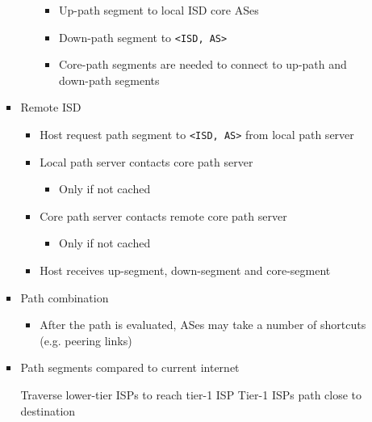 \begin{itemize}
\begin{itemize}
\begin{itemize}
\begin{itemize}
\begin{itemize}
                                    \item Up-path segment to local ISD core ASes
                                    \item Down-path segment to \verb+<ISD, AS>+
                                    \item Core-path segments are needed to connect to up-path and down-path segments
                                \end{itemize}
                        \end{itemize}
                    \item Remote ISD
                        \begin{itemize}
                            \item Host request path segment to \verb+<ISD, AS>+ from local path server
                            \item Local path server contacts core path server
                                \begin{itemize}
                                    \item Only if not cached
                                \end{itemize}
                            \item Core path server contacts remote core path server
                                \begin{itemize}
                                    \item Only if not cached
                                \end{itemize}
                            \item Host receives up-segment, down-segment and core-segment
                        \end{itemize}
                    \item Path combination
                        \begin{itemize}
                            \item After the path is evaluated, ASes may take a number of shortcuts (e.g. peering links)
                        \end{itemize}
                    \item Path segments compared to current internet
                        \begin{itemize}
                             Traverse lower-tier ISPs to reach tier-1 ISP
                             Tier-1 ISPs path close to destination

\end{itemize}
\end{itemize}
\end{itemize}
\end{itemize}
